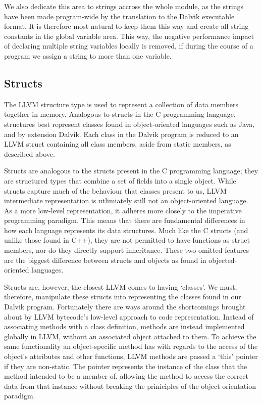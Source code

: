 We also dedicate this area to strings accross the whole module, as the strings have been made program-wide by the translation to the Dalvik executable format. It is therefore most natural to keep them this way and create all string constants in the global variable area. This way, the negative performance impact of declaring multiple string variables locally is removed, if during the course of a program we assign a string to more than one variable.

\subsection*{Structs}

The LLVM structure type is used to represent a collection of data members together in memory. Analogous to structs in the C programming language, structures best represent classes found in object-oriented languages such as Java, and by extension Dalvik. Each class in the Dalvik program is reduced to an LLVM struct containing all class members, aside from static members, as described above.

Structs are analogous to the structs present in the C programming language; they are structured types that combine a set of fields into a single object. While structs capture much of the behaviour that classes present to us, LLVM intermediate representation is utlimiately still not an object-oriented language. As a more low-level representation, it adheres more closely to the imperative programming paradigm. This means that there are fundamental differences in how each language represents its data structures. Much like the C structs (and unlike those found in C++), they are not permitted to have functions as struct members, nor do they directly support inheritance. These two omitted features are the biggest difference between structs and objects as found in objected-oriented languages.

Structs are, however, the closest LLVM comes to having `classes'. We must, therefore, manipulate these structs into representing the classes found in our Dalvik program. Fortunately there are ways around the shortcomings brought about by LLVM bytecode's low-level approach to code representation. Instead of associating methods with a class definition, methods are instead implemented globally in LLVM, without an associated object attached to them. To achieve the same functionality an object-specific method has with regards to the access of the object's attributes and other functions, LLVM methods are passed a `this' pointer if they are non-static. The pointer represents the instance of the class that the method intended to be a member of, allowing the method to access the correct data from that instance without breaking the priniciples of the object orientation paradigm.

